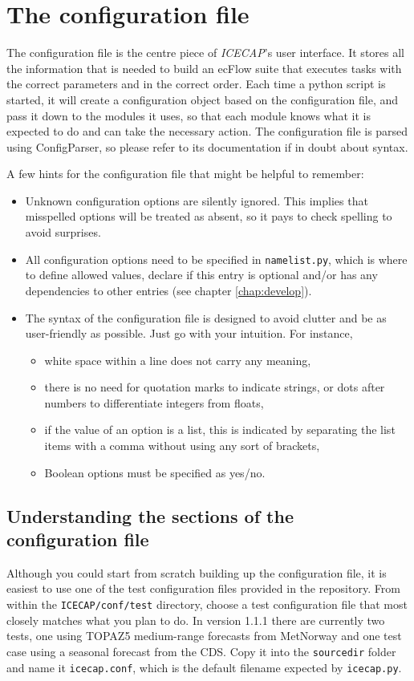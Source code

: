 \documentclass[DIV=10, parskip=full]{scrreprt}
\newcommand{\ice}{\textit{ICECAP}\xspace}
\newcommand{\version}{1.1.1\xspace}
\begin{document}
\section{The configuration file}\label{chap:config}
The configuration file is the centre piece of {\ice}'s user interface. It stores  all the information that is needed to build an ecFlow suite that executes tasks with the correct parameters and in the correct order. Each time a python script is started, it will create a configuration object based on the configuration file, and pass it down to the modules it uses, so that each module knows what it is expected to do and can take the necessary action. The configuration file is parsed using ConfigParser, so please refer to its documentation if in doubt about syntax. 

A few hints for the configuration file that might be helpful to remember:
\begin{itemize}
 \item Unknown configuration options are silently ignored. This implies that misspelled options will be treated as absent, so it pays to check spelling to avoid surprises.
 \item All configuration options need to be specified in \texttt{namelist.py}, which is where to define allowed values, declare if this entry is optional and/or has any dependencies to other entries (see chapter \ref{chap:develop}).
 \item The syntax of the configuration file is designed to avoid clutter and be as user-friendly as possible. Just go with your intuition. For instance,
 \begin{itemize}
   \item white space within a line does not carry any meaning,
   \item there is no need for quotation marks to indicate strings, or dots after numbers to differentiate integers from floats,
   \item if the value of an option is a list, this is indicated by separating the list items with a comma without using any sort of brackets,
   \item Boolean options must be specified as yes/no.
 \end{itemize}
\end{itemize}


\subsection{Understanding the sections of the configuration file}
Although you could start from scratch building up the configuration file, it is easiest to use one of the test configuration files provided in the repository. From within the \texttt{ICECAP/conf/test} directory, choose a test configuration file that most closely matches what you plan to do. In version \version there are currently two tests, one using TOPAZ5 medium-range forecasts from MetNorway and one test case using a seasonal forecast from the CDS. Copy it into the \texttt{sourcedir} folder and name it \texttt{icecap.conf}, which is the default filename expected by \texttt{icecap.py}. 
\end{document}

